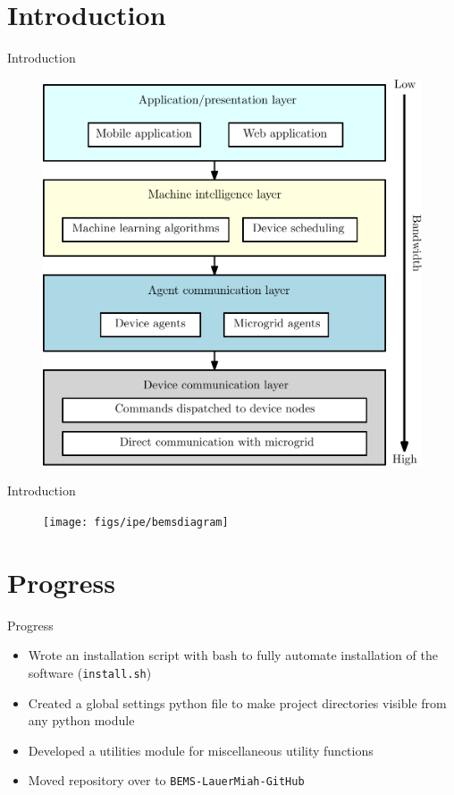 \section{Introduction}

\begin{frame}{Introduction}{}
  \begin{figure}
  \includegraphics[scale=0.35]{figs/ipe/BEMS-softwareArchitecture}
  \end{figure}
\end{frame}

\begin{frame}{Introduction}{}
  \begin{figure}
  \texttt{[image: figs/ipe/bemsdiagram]}
  \end{figure}
\end{frame}


\section{Progress}
\begin{frame}{Progress}{}
\begin{itemize}
	\item Wrote an installation script with bash to fully automate installation of the software (\texttt{install.sh})
	\item Created a global settings python file to make project directories visible from any python module
	\item Developed a utilities module for miscellaneous utility functions
	\item Moved repository over to \texttt{BEMS-LauerMiah-GitHub}
\end{itemize}
\end{frame}


